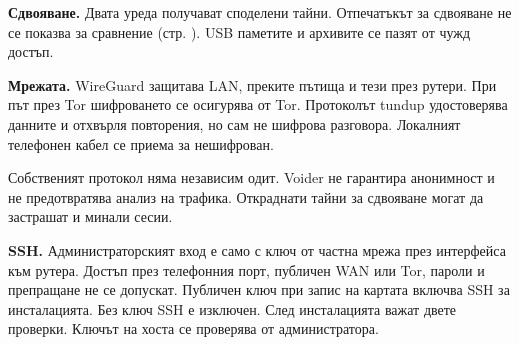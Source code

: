 \textbf{Сдвояване.} Двата уреда получават споделени тайни. Отпечатъкът за сдвояване не се показва за сравнение (стр. \pageref{bg:add}). USB паметите и архивите се пазят от чужд достъп.

\textbf{Мрежата.} WireGuard защитава LAN, преките пътища и тези през рутери. При път през Tor шифроването се осигурява от Tor. Протоколът tundup удостоверява данните и отхвърля повторения, но сам не шифрова разговора. Локалният телефонен кабел се приема за нешифрован.

Собственият протокол няма независим одит. Voider не гарантира анонимност и не предотвратява анализ на трафика. Откраднати тайни за сдвояване могат да застрашат и минали сесии.

\textbf{SSH.} Администраторският вход е само с ключ от частна мрежа през интерфейса към рутера. Достъп през телефонния порт, публичен WAN или Tor, пароли и препращане не се допускат. Публичен ключ при запис на картата включва SSH за инсталацията. Без ключ SSH е изключен. След инсталацията важат двете проверки. Ключът на хоста се проверява от администратора.

